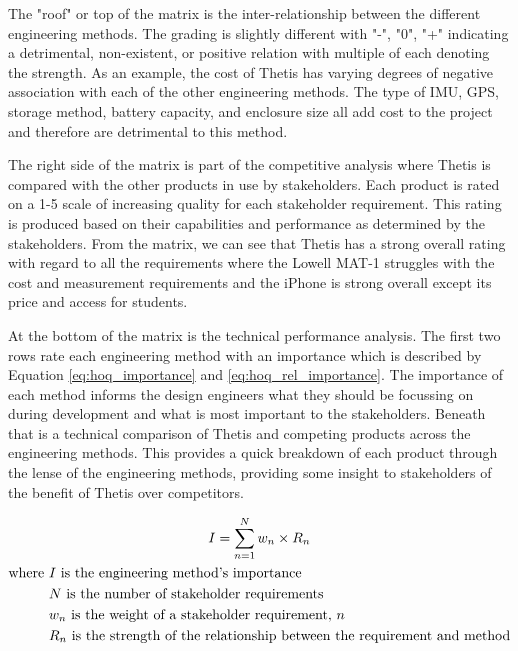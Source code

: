 The "roof" or top of the matrix is the inter-relationship between the different engineering methods.
The grading is slightly different with "-", "0", "+" indicating a detrimental, non-existent, or positive relation with multiple of each denoting the strength.
As an example, the cost of Thetis has varying degrees of negative association with each of the other engineering methods.
The type of IMU, GPS, storage method, battery capacity, and enclosure size all add cost to the project and therefore are detrimental to this method.

The right side of the matrix is part of the competitive analysis where Thetis is compared with the other products in use by stakeholders.
Each product is rated on a 1-5 scale of increasing quality for each stakeholder requirement.
This rating is produced based on their capabilities and performance as determined by the stakeholders.
From the matrix, we can see that Thetis has a strong overall rating with regard to all the requirements where the Lowell MAT-1 struggles with the cost and measurement requirements and the iPhone is strong overall except its price and access for students.

At the bottom of the matrix is the technical performance analysis.
The first two rows rate each engineering method with an importance which is described by Equation \ref{eq:hoq_importance} and \ref{eq:hoq_rel_importance}.
The importance of each method informs the design engineers what they should be focussing on during development and what is most important to the stakeholders.
Beneath that is a technical comparison of Thetis and competing products across the engineering methods.
This provides a quick breakdown of each product through the lense of the engineering methods, providing some insight to stakeholders of the benefit of Thetis over competitors.

\begin{gather}
	\label{eq:hoq_importance}
	I = \sum_{n=1}^N{w_n \times R_n} \\
	\begin{aligned}
		\text{where } &I \text{ is the engineering method's importance} \\
					  &N \text{ is the number of stakeholder requirements} \\
					  &w_n \text{ is the weight of a stakeholder requirement, } n \\
					  &R_n \text{ is the strength of the relationship between the requirement and method}
	\end{aligned} \notag
\end{gather}


